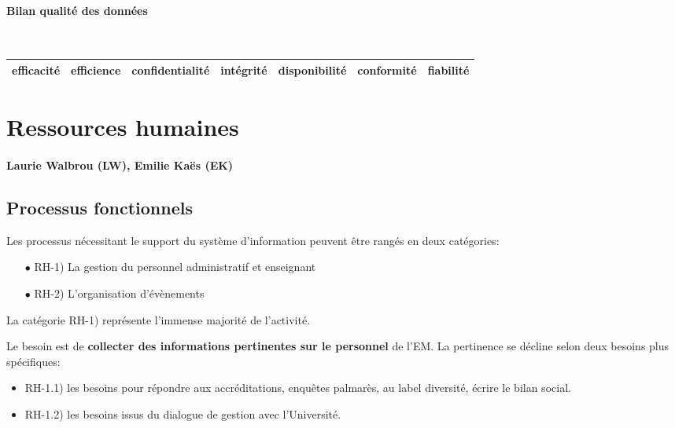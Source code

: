 \documentclass{book}
\begin{document}
\paragraph{Bilan qualité des données}
~\\


	\begin{tabular}{|l|l|l|l|l|l|l|}
	\hline
	efficacité	& efficience &	confidentialité	& intégrité & disponibilité & conformité & fiabilité \\
	\hline
	
	\hline
	\end{tabular}
	


\section{Ressources humaines}

\paragraph{Laurie Walbrou (LW), Emilie Kaës (EK)}


\subsection{Processus fonctionnels}
\label{sc:rh-process}
Les processus nécessitant le support du système d'information peuvent 
être rangés en deux catégories:
\begin{itemize}
\item[$\bullet$] RH-1) La gestion du personnel administratif et enseignant
\item[$\bullet$] RH-2) L'organisation d'évènements
\end{itemize}
\bigskip

La catégorie RH-1) représente l'immense majorité de l'activité.

Le besoin est de \textbf{collecter des informations pertinentes
sur le personnel} de l'EM. La pertinence se décline selon
deux besoins plus spécifiques:
\begin{itemize}
\item RH-1.1) les besoins pour répondre aux accréditations, enquêtes 
	palmarès, au label diversité, écrire le bilan social.
\item RH-1.2) les besoins issus du dialogue de gestion avec l'Université.
\end{itemize}
\end{document}
